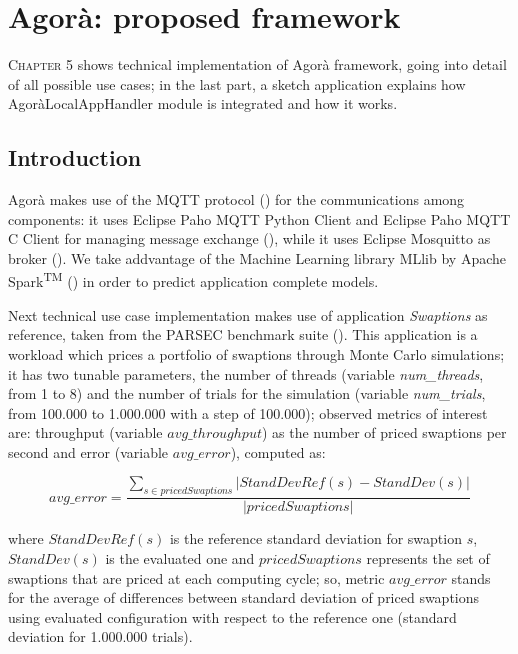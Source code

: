 \chapter{Agorà: proposed framework}\label{agora}

\lettrine{C}{hapter} 5 shows technical implementation of Agorà framework, going into detail of all possible use cases; in the last part, a sketch application explains how AgoràLocalAppHandler module is integrated and how it works.


\section{Introduction}

Agorà makes use of the MQTT protocol (\cite{banks2014mqtt}) for the communications among components: it uses Eclipse Paho MQTT Python Client and Eclipse Paho MQTT C Client for managing message exchange (\cite{o2014paho}), while it uses Eclipse Mos\-quitto as broker (\cite{light2013mosquitto}). We take addvantage of the Machine Learning library MLlib by Apache Spark\textsuperscript{TM} (\cite{spark2015apache}) in order to predict application complete models.

Next technical use case implementation makes use of application \textit{Swaptions} as reference, taken from the PARSEC benchmark suite (\cite{bienia2008parsec}). This application is a workload which prices a portfolio of swaptions through Monte Carlo simulations; it has two tunable parameters, the number of threads (variable \textit{num\_threads}, from 1 to 8) and the number of trials for the simulation (variable \textit{num\_trials}, from 100.000 to 1.000.000 with a step of 100.000); observed metrics of interest are: throughput (variable $avg\_throughput$) as the number of priced swaptions per second and error (variable $avg\_error$), computed as:

\[
avg\_error = \dfrac{\sum_{s \in pricedSwaptions} \left\vert StandDevRef(s) - StandDev(s) \right\vert}{\left\vert pricedSwaptions \right\vert}
\]

where $StandDevRef(s)$ is the reference standard deviation for swaption $s$, $StandDev(s)$ is the evaluated one and $pricedSwaptions$ represents the set of swaptions that are priced at each computing cycle; so, metric $avg\_error$ stands for the average of differences between standard deviation of priced swaptions using evaluated configuration with respect to the reference one (standard deviation for 1.000.000 trials).


